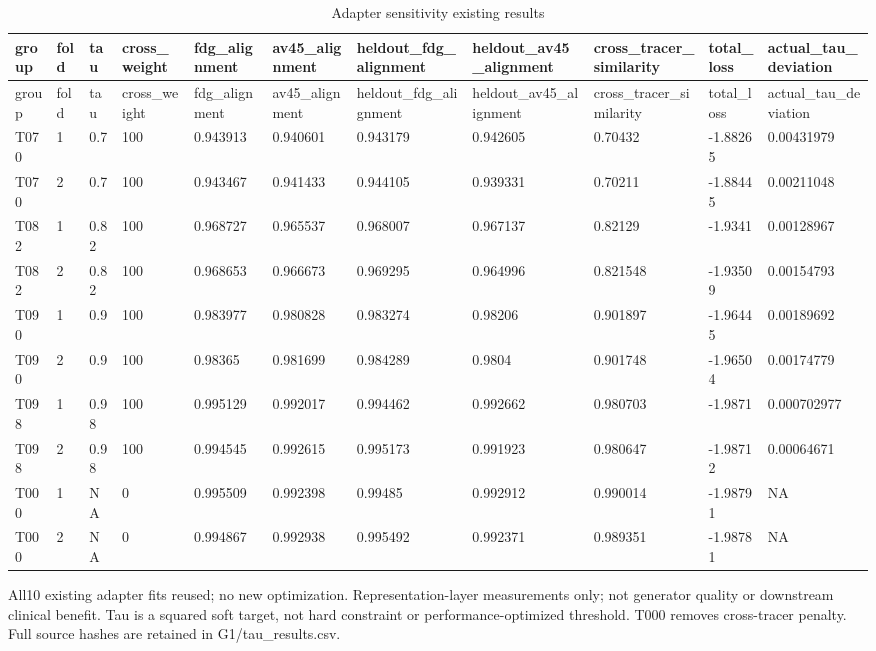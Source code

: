 \begin{landscape}
\begingroup
\footnotesize
\setlength{\tabcolsep}{4pt}
\begin{longtable}{lllllllllll}
\caption{Adapter sensitivity existing results}\label{tab:s-n19}\\
\toprule
group & fold & tau & cross\_weight & fdg\_alignment & av45\_alignment & heldout\_fdg\_alignment & heldout\_av45\_alignment & cross\_tracer\_similarity & total\_loss & actual\_tau\_deviation \\
\midrule
\endfirsthead
\toprule
group & fold & tau & cross\_weight & fdg\_alignment & av45\_alignment & heldout\_fdg\_alignment & heldout\_av45\_alignment & cross\_tracer\_similarity & total\_loss & actual\_tau\_deviation \\
\midrule
\endhead
\bottomrule
\endfoot
T070 & 1 & 0.7 & 100 & 0.943913 & 0.940601 & 0.943179 & 0.942605 & 0.70432 & -1.88265 & 0.00431979 \\
T070 & 2 & 0.7 & 100 & 0.943467 & 0.941433 & 0.944105 & 0.939331 & 0.70211 & -1.88445 & 0.00211048 \\
T082 & 1 & 0.82 & 100 & 0.968727 & 0.965537 & 0.968007 & 0.967137 & 0.82129 & -1.9341 & 0.00128967 \\
T082 & 2 & 0.82 & 100 & 0.968653 & 0.966673 & 0.969295 & 0.964996 & 0.821548 & -1.93509 & 0.00154793 \\
T090 & 1 & 0.9 & 100 & 0.983977 & 0.980828 & 0.983274 & 0.98206 & 0.901897 & -1.96445 & 0.00189692 \\
T090 & 2 & 0.9 & 100 & 0.98365 & 0.981699 & 0.984289 & 0.9804 & 0.901748 & -1.96504 & 0.00174779 \\
T098 & 1 & 0.98 & 100 & 0.995129 & 0.992017 & 0.994462 & 0.992662 & 0.980703 & -1.9871 & 0.000702977 \\
T098 & 2 & 0.98 & 100 & 0.994545 & 0.992615 & 0.995173 & 0.991923 & 0.980647 & -1.98712 & 0.00064671 \\
T000 & 1 & NA & 0 & 0.995509 & 0.992398 & 0.99485 & 0.992912 & 0.990014 & -1.98791 & NA \\
T000 & 2 & NA & 0 & 0.994867 & 0.992938 & 0.995492 & 0.992371 & 0.989351 & -1.98781 & NA \\
\end{longtable}
\noindent\parbox{\linewidth}{\footnotesize All10 existing adapter fits reused; no new optimization. Representation-layer measurements only; not generator quality or downstream clinical benefit. Tau is a squared soft target, not hard constraint or performance-optimized threshold. T000 removes cross-tracer penalty. Full source hashes are retained in G1/tau\_results.csv.}
\endgroup
\end{landscape}
